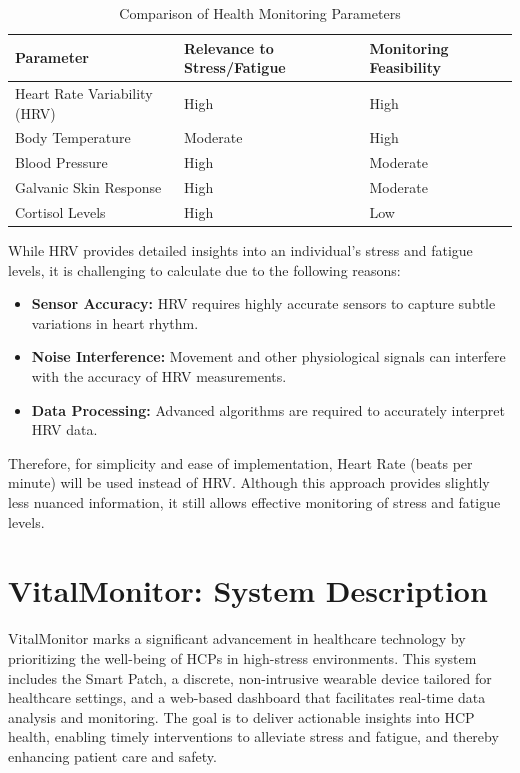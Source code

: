 \begin{table}[h!]
\centering 
\begin{tabularx}{\textwidth}{|X|X|X|}
\hline 
\textbf{Parameter} & \textbf{Relevance to Stress/Fatigue} & \textbf{Monitoring Feasibility} \\ 
\hline Heart Rate Variability (HRV) & High & High \\ 
\hline Body Temperature & Moderate & High \\ 
\hline Blood Pressure & High & Moderate \\ 
\hline Galvanic Skin Response & High & Moderate \\ 
\hline Cortisol Levels & High & Low \\ 
\hline
\end{tabularx}
\caption{Comparison of Health Monitoring Parameters}
\label{tab:health_parameters}
\end{table}



\noindent While HRV provides detailed insights into an individual's stress and fatigue levels, it is challenging to calculate due to the following reasons:
\begin{itemize}
    \item  \textbf{Sensor Accuracy:} HRV requires highly accurate sensors to capture subtle variations in heart rhythm.
    \item  \textbf{Noise Interference:} Movement and other physiological signals can interfere with the accuracy of HRV measurements.
    \item  \textbf{Data Processing:} Advanced algorithms are required to accurately interpret HRV data.
\end{itemize}

\noindent Therefore, for simplicity and ease of implementation, Heart Rate (beats per minute) will be used instead of HRV. Although this approach provides slightly less nuanced information, it still allows effective monitoring of stress and fatigue levels.


\section{VitalMonitor: System Description}
VitalMonitor marks a significant advancement in healthcare technology by prioritizing the well-being of HCPs in high-stress environments. This system includes the Smart Patch, a discrete, non-intrusive wearable device tailored for healthcare settings, and a web-based dashboard that facilitates real-time data analysis and monitoring. The goal is to deliver actionable insights into HCP health, enabling timely interventions to alleviate stress and fatigue, and thereby enhancing patient care and safety. \\ 

